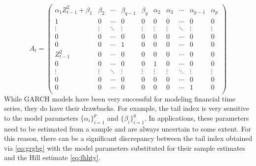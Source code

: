 \begin{equation}
  \label{eq:A_matrix:intro}
  A_t =
  \begin{pmatrix}
    \alpha_1 Z_{t-1}^2 + \beta_1 & \beta_2 & \cdots &
    \beta_{q-1} & \beta_q & \alpha_2 & \alpha_3 &
    \cdots & \alpha_{p-1} & \alpha_p\\
    1 & 0 & \cdots & 
    0 & 0 & 0 & 0 & \cdots & 0 & 0 \\
    \vdots & \vdots & \ddots & 
    \vdots & \vdots & \vdots & \vdots &
    \ddots & \vdots & \vdots \\
    0 & 0 & \cdots &
    0 & 0 & 0 & 0 & \cdots & 0 & 0 \\
    0 & 0 & \cdots &
    1 & 0 & 0 & 0 & \cdots & 0 & 0 \\
    Z_{t-1}^2 & 0 & \cdots &
    0 & 0 & 0 & 0 & \cdots & 0 & 0 \\
    0 & 0 & \cdots &
    0 & 0 & 1 & 0 & \cdots & 0 & 0 \\
    \vdots & \vdots & \ddots &
    \vdots & \vdots & \vdots & \vdots &
    \ddots & \vdots & \vdots \\
    0 & 0 & \cdots &
    0 & 0 & 0 & 0 & \cdots & 0 & 0 \\    
    0 & 0 & \cdots &
    0 & 0 & 0 & 0 & \cdots & 1 & 0 \\    
  \end{pmatrix}
\end{equation}
While GARCH models have been very successful for modeling financial
time series, they do have their drawbacks. For example, the tail
index is very sensitive to the model parameters $\{\alpha_i\}_{i=1}^p$ and
$\{\beta_i\}_{i=1}^q$. In applications, these parameters need to be
estimated from a sample and are always uncertain to some extent. For
this reason, there can be a significant discrepancy between the tail
index obtained via \eqref{eq:grgbg} with the model parameters
substituted for their sample estimates and the Hill estimate
\eqref{eq:fhhty}.

